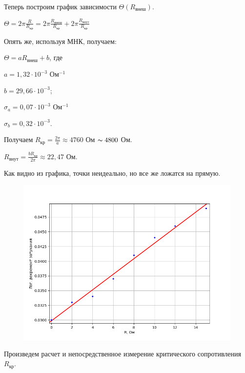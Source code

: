 \documentclass[a4paper,12pt]{article} %
\begin{document}
Теперь построим график зависимости $\Theta(R_{\text{внеш}})$.

$\Theta = 2\pi \frac{R}{R_{\text{кр}}} = 2\pi \frac{R_{\text{внеш}}}{R_{\text{кр}}} + 2\pi\frac{R_{\text{внут}}}{R_{\text{кр}}}$

Опять же, используя МНК, получаем:

\noindent $\Theta = aR_{\text{внеш}} + b$, где

\noindent $a = 1,32 \cdot 10^{-3} $ Ом$^{-1}$ 

\noindent $b = 29,66 \cdot 10^{-3}$;

\noindent $\sigma_a = 0,07 \cdot 10^{-3} $ Ом$^{-1}$ 

\noindent $\sigma_b = 0,32 \cdot 10^{-3}$.
\vspace{7mm}

\noindent Получаем $R_{\text{кр}} = \frac{2\pi}{a} \approx 4760$ Ом $\thicksim 4800$  Ом.

\noindent $R_{\text{внут}} = \frac{bR_{\text{кр}}}{2\pi} \approx 22,47$ Ом.

\noindent Как видно из графика, точки неидеально, но все же ложатся на прямую.

\newpage

\begin{figure}[h!]
	\begin{center}
		\includegraphics[scale=0.85]{Q(R).png}
	\end{center}
\end{figure}

Произведем расчет и непосредственное измерение критического сопротивления $R_{\text{кр}}$.
\end{document}
